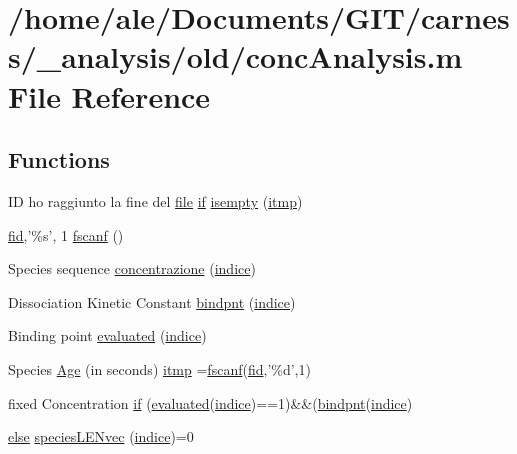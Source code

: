 \hypertarget{a00019}{\section{/home/ale/\-Documents/\-G\-I\-T/carness/\-\_\-analysis/old/conc\-Analysis.m File Reference}
\label{a00019}
}
\subsection*{Functions}
\begin{DoxyCompactItemize}
\item 
I\-D ho raggiunto la fine del \hyperlink{a00062_a4e8353d6c62cf54bf4a1a8f63e56b8c3}{file} \hyperlink{a00024_a01d55766b8058903dd360b4bda71f9f5}{if} \hyperlink{a00019_ac10445404f4b83302522defb59e25ef7}{isempty} (\hyperlink{a00019_af17812863fb385a507b5b07ed6166569}{itmp})
\item 
\hyperlink{a00025_ae9011d40c6f13e68e6f07156e0da7c5d}{fid},'\%s', 1 \hyperlink{a00019_a028ac102a731e62fb0a7439381f566c1}{fscanf} ()
\item 
Species sequence \hyperlink{a00019_a816e2260bf1c36cbca7ade7517c19b07}{concentrazione} (\hyperlink{a00019_a776b2bbd08be028d44f6d4260f27633a}{indice})
\item 
Dissociation Kinetic Constant \hyperlink{a00019_abe7c50c8b184b4269ba5aaecedcd5457}{bindpnt} (\hyperlink{a00019_a776b2bbd08be028d44f6d4260f27633a}{indice})
\item 
Binding point \hyperlink{a00019_a5e1fe2a8074aede6ad4a7a0613f0f91c}{evaluated} (\hyperlink{a00019_a776b2bbd08be028d44f6d4260f27633a}{indice})
\item 
Species \hyperlink{a00019_aefba28007767b12696670c7309808dd1}{Age} (in seconds) \hyperlink{a00019_af17812863fb385a507b5b07ed6166569}{itmp} =\hyperlink{a00019_a028ac102a731e62fb0a7439381f566c1}{fscanf}(\hyperlink{a00025_ae9011d40c6f13e68e6f07156e0da7c5d}{fid},'\%d',1)
\item 
fixed Concentration \hyperlink{a00019_adf3394dfd4755fd0ef2854fe558ff8aa}{if} (\hyperlink{a00019_a5e1fe2a8074aede6ad4a7a0613f0f91c}{evaluated}(\hyperlink{a00019_a776b2bbd08be028d44f6d4260f27633a}{indice})==1)\&\&(\hyperlink{a00019_abe7c50c8b184b4269ba5aaecedcd5457}{bindpnt}(\hyperlink{a00019_a776b2bbd08be028d44f6d4260f27633a}{indice})
\item 
\hyperlink{a00025_af5946383720aa572eb93e1e63afc23c2}{else} \hyperlink{a00019_a63d65c48296edd79c9a2419e091206d0}{species\-L\-E\-Nvec} (\hyperlink{a00019_a776b2bbd08be028d44f6d4260f27633a}{indice})=0

\end{DoxyCompactItemize}
